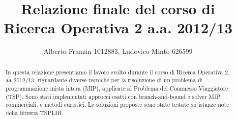 \documentclass[a4paper,11pt]{report}
\author{Alberto Franzin 1012883, Ludovico Minto 626599}
\title{Relazione finale del corso di Ricerca Operativa 2 a.a. 2012/13}
\begin{document}
\maketitle

\begin{abstract}
In questa relazione presentiamo il lavoro svolto durante il corso di Ricerca Operativa 2, aa 2012/13, riguardante diverse tecniche per la risoluzione di un problema di programmazione mista intera (MIP), applicate al Problema del Commesso Viaggiatore (TSP). Sono stati implementati approcci esatti con branch-and-bound e solver MIP commerciali, e metodi euristici. Le soluzioni proposte sono state testate su istanze note della libreria TSPLIB.
\end{abstract}

\tableofcontents









\end{document}
